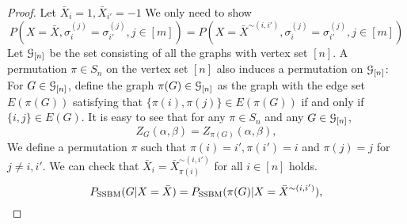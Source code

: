 \documentclass{article}
\begin{document}
\begin{proof}
Let $\bar{X}_i = 1, \bar{X}_{i'}=-1$ We only need to show
\begin{equation}\label{eq:12}
P(X=\bar{X}, \sigma_i^{(j)} = \sigma_{i'}^{(j)}, j\in[m]) = P(X=\bar{X}^{\sim(i,i')}, \sigma_i^{(j)} = \sigma_{i'}^{(j)}, j\in[m])
\end{equation}
Let $\mathcal{G}_{[n]}$ be the set consisting of all the graphs with vertex set $[n]$.
A permutation $\pi\in S_n$ on the vertex set $[n]$ also induces a permutation on $\mathcal{G}_{[n]}$: For $G\in\mathcal{G}_{[n]}$, define the graph $\pi(G)\in\mathcal{G}_{[n]}$ as the graph with the edge set $E(\pi(G))$ satisfying that $\{\pi(i),\pi(j)\}\in E(\pi(G))$ if and only if $\{i,j\}\in E(G)$.
It is easy to see that for any $\pi\in S_n$ and any $G\in\mathcal{G}_{[n]}$,
$$
Z_G(\alpha,\beta)
=Z_{\pi(G)}(\alpha,\beta),
$$
We define a permutation $\pi$ such that $\pi(i) = i', \pi(i') = i$ and $\pi(j) = j$ for $j\neq i,i'$.
We can check that $\bar{X}_i=\bar{X}^{\sim(i,i')}_{\pi(i)}$ for all $i\in[n]$ holds.
$$
P_{\operatorname{SSBM}}(G  | X = \bar{X})=P_{\operatorname{SSBM}}(\pi(G) | X = \bar{X}^{\sim(i,i')})  ,
$$


\end{proof}
\end{document}
